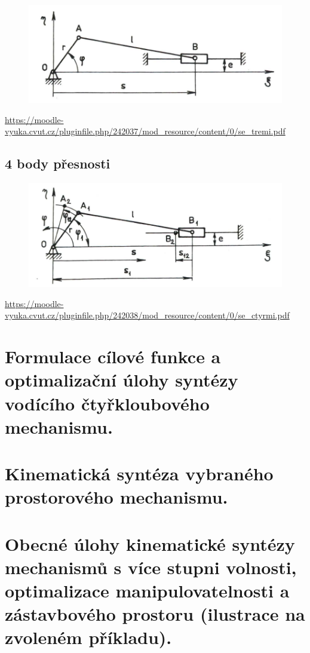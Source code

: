 \documentclass{article}
\begin{document}
	\begin{figure}[h!]
		\centering
		\includegraphics{figs/KlikovyMechanismus.png}
	\end{figure}

	\url{https://moodle-vyuka.cvut.cz/pluginfile.php/242037/mod_resource/content/0/se_tremi.pdf}

	\subsection*{4 body přesnosti}
	\begin{figure}[h!]
		\centering
		\includegraphics{figs/KlikovyMechanismus4.png}
	\end{figure}

	\url{https://moodle-vyuka.cvut.cz/pluginfile.php/242038/mod_resource/content/0/se_ctyrmi.pdf}

	\pagebreak
	\section{Formulace cílové funkce a optimalizační úlohy syntézy vodícího čtyřkloubového mechanismu.}
	\pagebreak

	\section{Kinematická syntéza vybraného prostorového mechanismu.}

	\section{Obecné úlohy kinematické syntézy mechanismů s více stupni volnosti, optimalizace manipulovatelnosti a zástavbového prostoru (ilustrace na zvoleném příkladu).}
\end{document}
